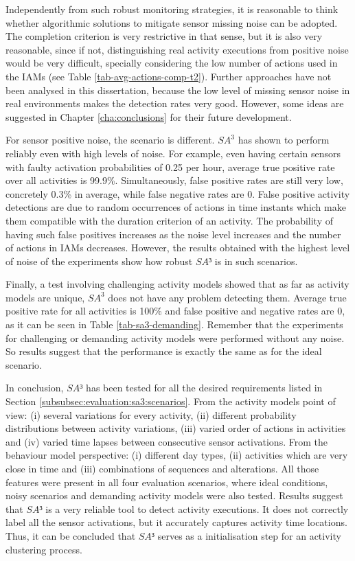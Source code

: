 Independently from such robust monitoring strategies, it is reasonable to think whether algorithmic solutions to mitigate sensor missing noise can be adopted. The completion criterion is very restrictive in that sense, but it is also very reasonable, since if not, distinguishing real activity executions from positive noise would be very difficult, specially considering the low number of actions used in the IAMs (see Table \ref{tab-avg-actions-comp-t2}). Further approaches have not been analysed in this dissertation, because the low level of missing sensor noise in real environments makes the detection rates very good. However, some ideas are suggested in Chapter \ref{cha:conclusions} for their future development.

For sensor positive noise, the scenario is different. $SA^3$ has shown to perform reliably even with high levels of noise. For example, even having certain sensors with faulty activation probabilities of 0.25 per hour, average true positive rate over all activities is 99.9\%. Simultaneously, false positive rates are still very low, concretely 0.3\% in average, while false negative rates are 0. False positive activity detections are due to random occurrences of actions in time instants which make them compatible with the duration criterion of an activity. The probability of having such false positives increases as the noise level increases and the number of actions in IAMs decreases. However, the results obtained with the highest level of noise of the experiments show how robust $SA³$ is in such scenarios.

Finally, a test involving challenging activity models showed that as far as activity models are unique, $SA^3$ does not have any problem detecting them. Average true positive rate for all activities is 100\% and false positive and negative rates are 0, as it can be seen in Table \ref{tab-sa3-demanding}. Remember that the experiments for challenging or demanding activity models were performed without any noise. So results suggest that the performance is exactly the same as for the ideal scenario. 

In conclusion, $SA³$ has been tested for all the desired requirements listed in Section \ref{subsubsec:evaluation:sa3:scenarios}. From the activity models point of view: (i) several variations for every activity, (ii) different probability distributions between activity variations, (iii) varied order of actions in activities and (iv) varied time lapses between consecutive sensor activations. From the behaviour model perspective: (i) different day types, (ii) activities which are very close in time and (iii) combinations of sequences and alterations. All those features were present in all four evaluation scenarios, where ideal conditions, noisy scenarios and demanding activity models were also tested. Results suggest that $SA³$ is a very reliable tool to detect activity executions. It does not correctly label all the sensor activations, but it accurately captures activity time locations. Thus, it can be concluded that $SA³$ serves as a initialisation step for an activity clustering process.


